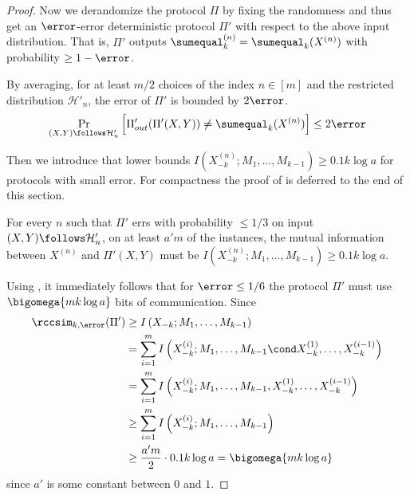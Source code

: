 \begin{proof}
	Now we derandomize the protocol $\Pi$ by fixing the randomness and thus get an $\error$-error deterministic protocol $\Pi'$ with respect to the above input distribution.
	That is, $\Pi'$ outputs $\sumequal_k^{(n)}=\sumequal_k(X^{(n)})$ with probability $\ge 1-\error$.

	By averaging, for at least $m/2$ choices of the index $n\in [m]$ and the restricted distribution $\mathcal{H}'_n$,
	the error of $\Pi'$ is bounded by $2\error$.
	\begin{align}
		\Pr_{(X,Y)\follows \mathcal{H}'_n}\left[ \Pi'_{out}(\Pi'(X,Y)) \ne \sumequal_k(X^{(n)}) \right] \le 
	2\error
	\end{align}

	Then we introduce  that 
	lower bounds $I\left(X^{(n)}_{-k}; M_1,\ldots, M_{k-1}\right)\ge 0.1{k\log a}$ for protocols with small error.
	For compactness the proof of  is deferred to the end of this section.

	\begin{lemma}\label{lemma: lb mutual information}
		For every $n$  such that $\Pi'$ errs with probability $\le 1/3$ on input  $(X,Y)\follows \mathcal{H}'_n$, on at least $a'm$ of the \sumequal instances,
		the mutual information between $X^{(n)}$ and $\Pi'(X,Y)$ must be
		$I\left(X^{(n)}_{-k}; M_1,\ldots, M_{k-1}\right)\ge 0.1{k\log a}$.
	\end{lemma}

	Using , it immediately follows that for $\error \le 1/6$ the protocol $\Pi'$ must use $\bigomega{mk\log a}$ bits of communication.
	Since
	\begin{align*}
	 	\rccsim_{k,\error}(\Pi') & \ge I\left(X_{-k}; M_1,\dots,M_{k-1} \right)\\
	 	& = \sum_{i=1}^m I\left(X^{(i)}_{-k}; M_1,\dots,M_{k-1}\cond X^{(1)}_{-k},\ldots,X^{(i-1)}_{-k} \right)\\
	 	& = \sum_{i=1}^m I\left(X^{(i)}_{-k}; M_1,\dots,M_{k-1}, X^{(1)}_{-k},\ldots,X^{(i-1)}_{-k} \right)\\
	 	& \ge \sum_{i=1}^m I\left(X^{(i)}_{-k}; M_1,\dots,M_{k-1} \right)\\
	 	& \ge \frac{a'm}{2}\cdot 0.1 k\log a =\bigomega{mk\log a}
	\end{align*} 
	since $a'$ is some constant between $0$ and $1$.
\end{proof}	

